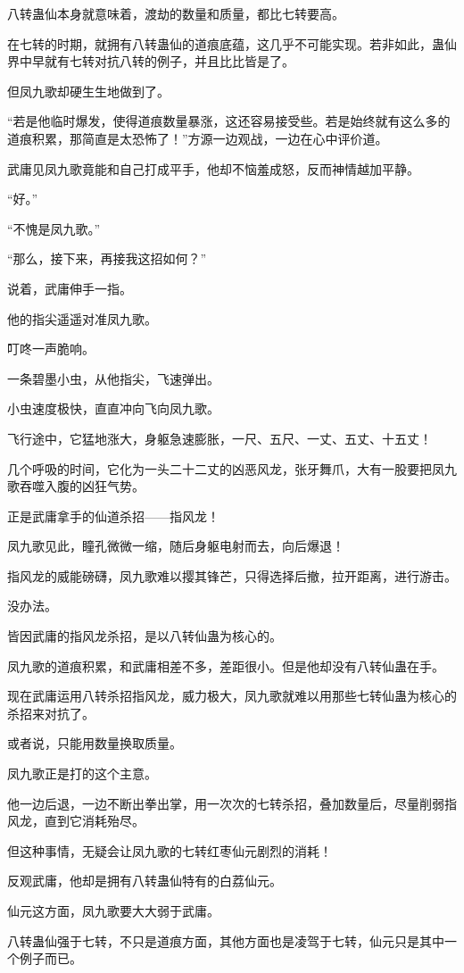 \begin{this_body}
八转蛊仙本身就意味着，渡劫的数量和质量，都比七转要高。

在七转的时期，就拥有八转蛊仙的道痕底蕴，这几乎不可能实现。若非如此，蛊仙界中早就有七转对抗八转的例子，并且比比皆是了。

但凤九歌却硬生生地做到了。

“若是他临时爆发，使得道痕数量暴涨，这还容易接受些。若是始终就有这么多的道痕积累，那简直是太恐怖了！”方源一边观战，一边在心中评价道。

武庸见凤九歌竟能和自己打成平手，他却不恼羞成怒，反而神情越加平静。

“好。”

“不愧是凤九歌。”

“那么，接下来，再接我这招如何？”

说着，武庸伸手一指。

他的指尖遥遥对准凤九歌。

叮咚一声脆响。

一条碧墨小虫，从他指尖，飞速弹出。

小虫速度极快，直直冲向飞向凤九歌。

飞行途中，它猛地涨大，身躯急速膨胀，一尺、五尺、一丈、五丈、十五丈！

几个呼吸的时间，它化为一头二十二丈的凶恶风龙，张牙舞爪，大有一股要把凤九歌吞噬入腹的凶狂气势。

正是武庸拿手的仙道杀招——指风龙！

凤九歌见此，瞳孔微微一缩，随后身躯电射而去，向后爆退！

指风龙的威能磅礴，凤九歌难以撄其锋芒，只得选择后撤，拉开距离，进行游击。

没办法。

皆因武庸的指风龙杀招，是以八转仙蛊为核心的。

凤九歌的道痕积累，和武庸相差不多，差距很小。但是他却没有八转仙蛊在手。

现在武庸运用八转杀招指风龙，威力极大，凤九歌就难以用那些七转仙蛊为核心的杀招来对抗了。

或者说，只能用数量换取质量。

凤九歌正是打的这个主意。

他一边后退，一边不断出拳出掌，用一次次的七转杀招，叠加数量后，尽量削弱指风龙，直到它消耗殆尽。

但这种事情，无疑会让凤九歌的七转红枣仙元剧烈的消耗！

反观武庸，他却是拥有八转蛊仙特有的白荔仙元。

仙元这方面，凤九歌要大大弱于武庸。

八转蛊仙强于七转，不只是道痕方面，其他方面也是凌驾于七转，仙元只是其中一个例子而已。


\end{this_body}
